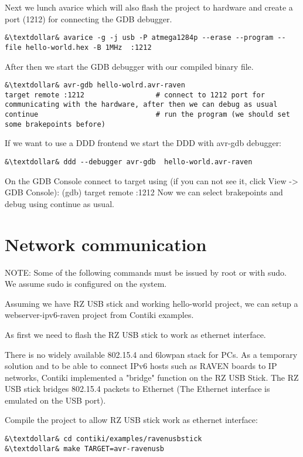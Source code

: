 \documentclass{article}
\begin{document}
Next we lunch avarice which will also flash the project to hardware and create a port (1212) for connecting the GDB debugger.
\begin{lstlisting}
&\textdollar& avarice -g -j usb -P atmega1284p --erase --program --file hello-world.hex -B 1MHz  :1212
\end{lstlisting}
After then we start the GDB debugger with our compiled binary file.
\begin{lstlisting}
&\textdollar& avr-gdb hello-wolrd.avr-raven
target remote :1212                 # connect to 1212 port for communicating with the hardware, after then we can debug as usual
continue                            # run the program (we should set some brakepoints before)
\end{lstlisting}
If we want to use a DDD frontend we start the DDD with avr-gdb debugger:
\begin{lstlisting}
&\textdollar& ddd --debugger avr-gdb  hello-world.avr-raven
\end{lstlisting}
On the GDB Console connect to target using (if you can not see it, click View -> GDB Console):
(gdb) target remote :1212
Now we can select brakepoints and debug using continue as usual.


\section{Network communication}
NOTE: Some of the following commands must be issued by root or with sudo. We assume sudo is configured on the system.

Assuming we have RZ USB stick and working hello-world project, we can setup a webserver-ipv6-raven project from Contiki examples.

As first we need to flash the RZ USB stick to work as ethernet interface.

There is no widely available 802.15.4 and 6lowpan stack for PCs.
As a temporary solution and to be able to connect IPv6 hosts such as RAVEN boards to IP networks,
Contiki implemented a "bridge" function on the RZ USB Stick.
The RZ USB stick bridges 802.15.4 packets to Ethernet (The Ethernet interface is emulated on the USB port).


Compile the project to allow RZ USB stick work as ethernet interface:
\begin{lstlisting}
&\textdollar& cd contiki/examples/ravenusbstick
&\textdollar& make TARGET=avr-ravenusb
\end{lstlisting}
\end{document}
